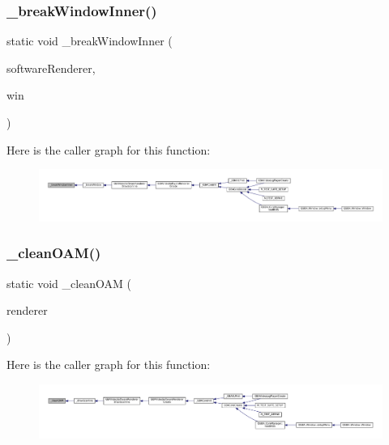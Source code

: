 \subsubsection{\texorpdfstring{\+\_\+break\+Window\+Inner()}{\_breakWindowInner()}}
{\footnotesize\ttfamily static void \+\_\+break\+Window\+Inner (\begin{DoxyParamCaption}\item[{struct G\+B\+A\+Video\+Software\+Renderer $\ast$}]{software\+Renderer,  }\item[{struct WindowN $\ast$}]{win }\end{DoxyParamCaption})\hspace{0.3cm}{\ttfamily [static]}}

Here is the caller graph for this function\+:
\nopagebreak
\begin{figure}[H]
\begin{center}
\leavevmode
\includegraphics[width=350pt]{video-software_8c_a1c60f25e3fc0fbe382de9e93c7bc9336_icgraph}
\end{center}
\end{figure}
\mbox{\label{video-software_8c_aa04dd06c1885063ab95ea424682c6fd2}} 
\subsubsection{\texorpdfstring{\+\_\+clean\+O\+A\+M()}{\_cleanOAM()}}
{\footnotesize\ttfamily static void \+\_\+clean\+O\+AM (\begin{DoxyParamCaption}\item[{struct G\+B\+A\+Video\+Software\+Renderer $\ast$}]{renderer }\end{DoxyParamCaption})\hspace{0.3cm}{\ttfamily [static]}}

Here is the caller graph for this function\+:
\nopagebreak
\begin{figure}[H]
\begin{center}
\leavevmode
\includegraphics[width=350pt]{video-software_8c_aa04dd06c1885063ab95ea424682c6fd2_icgraph}
\end{center}
\end{figure}
\mbox{\label{video-software_8c_a1bd325c93d45a428fbddba65a83a87e0}} 
